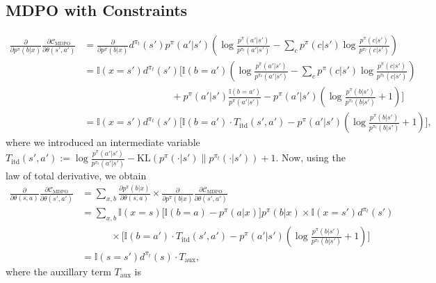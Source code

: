 \documentclass[a4paper, 10pt]{article}
\begin{document}
\subsection{MDPO with Constraints}
\begin{align}
  \frac{\partial}{\partial p^\pi(b | x)} \frac{\partial \mathcal{C}_{\text{MDPO}}}{\partial \theta(s', a')} &= \frac{\partial}{\partial p^\pi(b | x)} d^{\pi_t}(s') p^\pi(a' | s') \left( \log \frac{p^\pi(a' | s')}{p^{\pi_t}(a' | s')} - \sum_c p^\pi(c | s') \log \frac{p^\pi(c | s')}{p^{\pi_t}(c | s')} \right) \nonumber \\
  &= \mathbb{I}(x = s') d^{\pi_t}(s') \Bigg[ \mathbb{I}(b = a') \left( \log \frac{p^\pi(a' | s')}{p^{\pi_t}(a' | s')} - \sum_c p^\pi(c | s') \log \frac{p^\pi(c | s')}{p^{\pi_t}(c | s')} \right) \nonumber \\
    & \qquad \qquad \qquad \qquad \quad + p^\pi(a' | s') \frac{\mathbb{I}(b = a')}{p^\pi(a' | s')} - p^\pi(a' | s') \left( \log \frac{p^\pi(b | s')}{p^{\pi_t}(b | s')} + 1 \right) \Bigg] \nonumber \\
  &= \mathbb{I}(x = s') d^{\pi_t}(s') \Bigg[ \mathbb{I}(b = a') \cdot T_{\text{itd}}(s', a') - p^\pi(a' | s') \left( \log \frac{p^\pi(b | s')}{p^{\pi_t}(b | s')} + 1 \right) \Bigg],
\end{align}
where we introduced an intermediate variable $T_{\text{itd}}(s', a') := \log \frac{p^\pi(a' | s')}{p^{\pi_t}(a' | s')} - \text{KL} ( p^\pi(\cdot | s') \| p^{\pi_t}(\cdot | s') ) + 1$. Now, using the law of total derivative, we obtain
\begin{align}
  \frac{\partial}{\partial \theta(s, a)} \frac{\partial \mathcal{C}_{\text{MDPO}}}{\partial \theta(s', a')} &= \sum_{x, b} \frac{\partial p^\pi(b | x)}{\partial \theta(s, a)} \times \frac{\partial}{\partial p^\pi(b | x)} \frac{\partial \mathcal{C}_{\text{MDPO}}}{\partial \theta(s', a')} \nonumber \\
  &= \sum_{x, b} \mathbb{I}(x = s) \Big[ \mathbb{I}(b = a) - p^\pi(a | x) \Big] p^\pi(b | x) \times \mathbb{I}(x = s') d^{\pi_t}(s') \nonumber \\
  & \qquad \quad \times \Bigg[ \mathbb{I}(b = a') \cdot T_{\text{itd}}(s', a') - p^\pi(a' | s') \left( \log \frac{p^\pi(b | s')}{p^{\pi_t}(b | s')} + 1 \right) \Bigg] \nonumber \\
  &= \mathbb{I}(s = s') d^{\pi_t}(s) \cdot T_{\text{aux}},
\end{align}
where the auxillary term $T_{\text{aux}}$ is 
\end{document}
